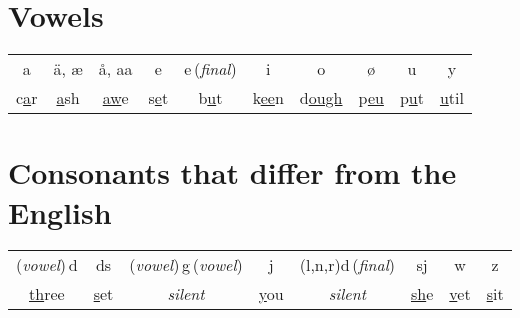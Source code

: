 \section*{Vowels}

\begin{tabular}{cccccccccc}
a & \"a, \ae & \aa, aa & e & e\,(\textit{final}) & i & o & \o & u & y \\
c\underline{a}r & \underline{a}sh & \underline{aw}e & s\underline{e}t & b\underline{u}t & k\underline{ee}n & d\underline{ough} & p\underline{eu} & p\underline{u}t & \underline{u}til \\
\end{tabular}


\section*{Consonants that differ from the English}

\begin{tabular}{cccccccc}
(\textit{vowel})\,d & ds & (\textit{vowel})\,g\,(\textit{vowel}) & j & (l,n,r)d\,(\textit{final}) & sj & w & z \\
\underline{th}ree & \underline{s}et & \textit{silent} & \underline{y}ou & \textit{silent} & \underline{sh}e & \underline{v}et & \underline{s}it \\
\end{tabular}
